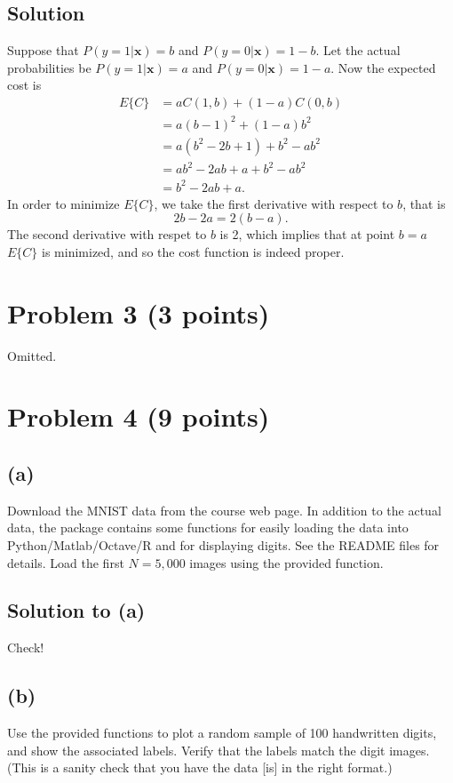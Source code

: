 \documentclass[10pt]{article}
\begin{document}
\subsection*{Solution}
Suppose that $P(y = 1 | \mathbf{x}) = b$ and $P(y = 0 | \mathbf{x}) = 1 - b$. Let the actual probabilities be $P(y = 1|\mathbf{x}) = a$ and $P(y = 0 | \mathbf{x}) = 1 - a$. Now the expected cost is 
\begin{align*}
E\{C\} &= aC(1, b) + (1 - a)C(0, b) \\
       &= a(b - 1)^2 + (1 - a)b^2 \\
       &= a(b^2 - 2b + 1) + b^2 - ab^2 \\
       &= ab^2 - 2ab + a + b^2 - ab^2 \\
       &= b^2 - 2ab + a.
\end{align*}
In order to minimize $E\{C\}$, we take the first derivative with respect to $b$, that is
\[
2b - 2a = 2(b - a).
\]
The second derivative with respet to $b$ is 2, which implies that at point $b = a$ $E\{C\}$ is minimized, and so the cost function is indeed proper.
\section*{Problem 3 (3 points)}
Omitted.

\section*{Problem 4 (9 points)}
\subsection*{(a)}
\color{blue}
Download the MNIST data from the course web page. In addition to the actual data, the package contains some functions for easily loading the data into Python/Matlab/Octave/R and for displaying digits. See the README files for details. Load the first $N=5,000$ images using the provided function.
\color{black}

\subsection*{Solution to (a)} 
Check!

\subsection*{(b)}
\color{blue}
Use the provided functions to plot a random sample of 100 handwritten digits, and show the associated labels. Verify that the labels match the digit images. (This is a sanity check that you have the data [is] in the right format.)
\color{black}
\end{document}
